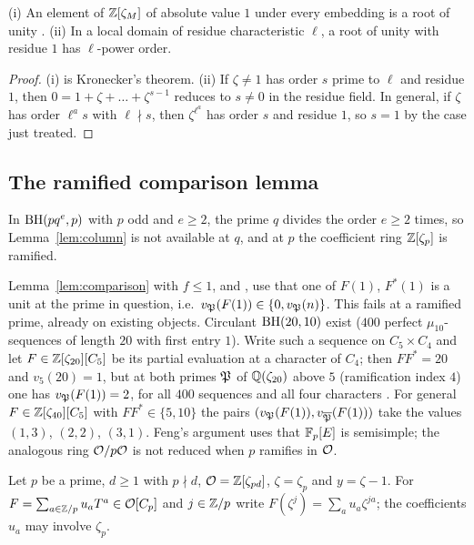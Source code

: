\begin{lemma}\label{lem:torsion}
\textup{(i)} An element of $\mathbb{Z}[\zeta_M]$ of absolute value $1$ under
every embedding is a root of unity \cite{Kronecker1857}.
\textup{(ii)} In a local domain of residue characteristic $\ell$, a root
of unity with residue $1$ has $\ell$-power order.
\end{lemma}

\begin{proof}
(i) is Kronecker's theorem. (ii) If $\zeta\ne1$ has order $s$ prime to
$\ell$ and residue $1$, then $0=1+\zeta+\dots+\zeta^{s-1}$ reduces to
$s\ne0$ in the residue field. In general, if $\zeta$ has order
$\ell^as$ with $\ell\nmid s$, then $\zeta^{\ell^a}$ has order $s$ and
residue $1$, so $s=1$ by the case just treated.
\end{proof}

\subsection{The ramified comparison lemma}\label{ssec:lemmaA}
In $\operatorname{BH}(pq^e,p)$ with $p$ odd and $e\ge2$, the prime $q$ divides the
order $e\ge2$ times, so Lemma~\ref{lem:column} is not available at $q$,
and at $p$ the coefficient ring $\mathbb{Z}[\zeta_p]$ is ramified.

\begin{example}\label{ex:fail}
Lemma~\ref{lem:comparison} with $f\le1$, and
\cite[Lemma~3.11]{LeungSchmidtZhang2023}, use that one of $F(1)$,
$F^*(1)$ is a unit at the prime in question, i.e.\
$v_{\mathfrak{P}}(F(1))\in\{0,v_{\mathfrak{P}}(n)\}$. This fails at a ramified prime, already on
existing objects. Circulant $\operatorname{BH}(20,10)$ exist ($400$ perfect
$\mu_{10}$-sequences of length $20$ with first entry $1$). Write such a
sequence on $C_5\times C_4$ and let $F\in\mathbb{Z}[\zeta_{20}][C_5]$ be its
partial evaluation at a character of $C_4$; then $FF^*=20$ and
$v_5(20)=1$, but at both primes $\mathfrak{P}$ of $\mathbb{Q}(\zeta_{20})$ above $5$
(ramification index $4$) one has $v_{\mathfrak{P}}(F(1))=2$, for all $400$ sequences
and all four characters \deptag{Comp}. For general
$F\in\mathbb{Z}[\zeta_{40}][C_5]$ with $FF^*\in\{5,10\}$ the pairs
$(v_{\mathfrak{P}}(F(1)),v_{\overline{\mathfrak{P}}}(F(1)))$ take the values $(1,3)$, $(2,2)$,
$(3,1)$. Feng's argument \cite[Lemmas~2, 3]{Feng2009} uses that
$\mathbb{F}_p[E]$ is semisimple; the analogous ring $\mathcal{O}/p\mathcal{O}$ is not reduced when
$p$ ramifies in $\mathcal{O}$.
\end{example}

Let $p$ be a prime, $d\ge1$ with $p\nmid d$, $\mathcal{O}=\mathbb{Z}[\zeta_{pd}]$,
$\zeta=\zeta_p$ and $y=\zeta-1$. For $F=\sum_{a\in\mathbb{Z}/p}u_aT^a\in\mathcal{O}[C_p]$
and $j\in\mathbb{Z}/p$ write $F(\zeta^j)=\sum_au_a\zeta^{ja}$; the coefficients
$u_a$ may involve $\zeta_p$.


